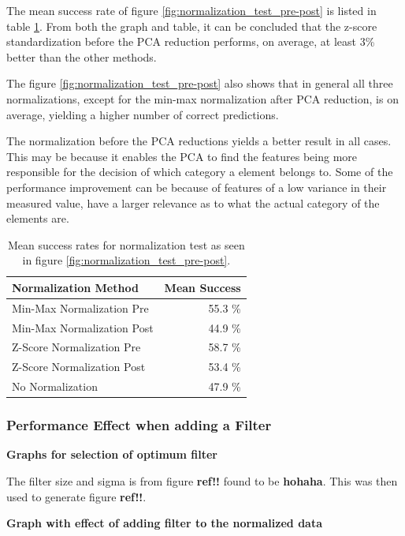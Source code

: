 The mean success rate of figure \ref{fig:normalization_test_pre-post} is listed in table \ref{tab:meanSuccess_normalization_test_pre-post}.
From both the graph and table, it can be concluded that the z-score standardization before the PCA reduction performs, on average, at least 3\% better than the other methods.

The figure \ref{fig:normalization_test_pre-post} also shows that in general all three normalizations, except for the min-max normalization after PCA reduction, is on average, yielding a higher number of correct predictions.

The normalization before the PCA reductions yields a better result in all cases. 
This may be because it enables the PCA to find the features being more responsible for the decision of which category a element belongs to. 
Some of the performance improvement can be because of features of a low variance in their measured value, have a larger relevance as to what the actual category of the elements are.


\begin{table}[H]
\centering
\begin{tabular}{|l|r|}\hline
Normalization Method & Mean Success \\ \hline
Min-Max Normalization Pre & 55.3 \% \\ \hline
Min-Max Normalization Post & 44.9 \% \\ \hline
Z-Score Normalization Pre & 58.7 \% \\ \hline
Z-Score Normalization Post & 53.4  \% \\ \hline
No Normalization & 47.9 \% \\ \hline
\end{tabular}
\caption{Mean success rates for normalization test as seen in figure \ref{fig:normalization_test_pre-post}.}
\label{tab:meanSuccess_normalization_test_pre-post}
\end{table}



\subsubsection{Performance Effect when adding a Filter}



\textbf{Graphs for selection of optimum filter}

The filter size and sigma is from figure \textbf{ref!!} found to be \textbf{hohaha}.
This was then used to generate figure \textbf{ref!!}.

\textbf{Graph with effect of adding filter to the normalized data}



